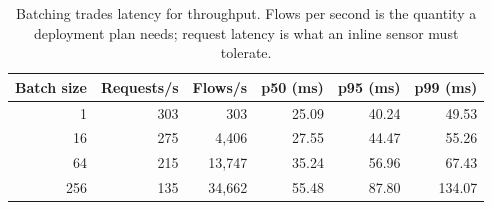\begin{table}[htbp]
\centering
\caption{Batching trades latency for throughput. Flows per second is the quantity a deployment plan needs; request latency is what an inline sensor must tolerate.}
\label{tab:servingbatch}
\footnotesize
\begin{tabular}{rrrrrr}
\hline
Batch size & Requests/s & Flows/s & p50 (ms) & p95 (ms) & p99 (ms) \\
\hline
1 & 303 & 303 & 25.09 & 40.24 & 49.53 \\
16 & 275 & 4,406 & 27.55 & 44.47 & 55.26 \\
64 & 215 & 13,747 & 35.24 & 56.96 & 67.43 \\
256 & 135 & 34,662 & 55.48 & 87.80 & 134.07 \\
\hline
\end{tabular}
\end{table}
